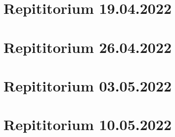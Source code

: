 \documentclass[a4paper,12pt]{article}
\begin{document}
\tableofcontents
\newpage
\section{Repititorium 19.04.2022}

\newpage
\section{Repititorium 26.04.2022}

\newpage
\section{Repititorium 03.05.2022}

\newpage
\section{Repititorium 10.05.2022}

\end{document}

